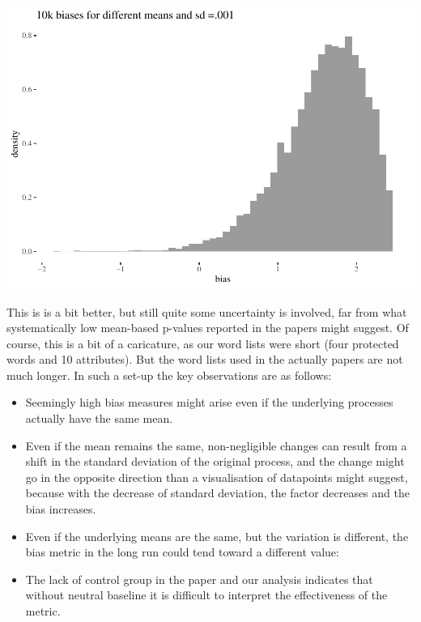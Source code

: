 \documentclass[
  10pt,
  dvipsnames,enabledeprecatedfontcommands]{scrartcl}
\begin{document}
\begin{center}\includegraphics[width=1\linewidth]{paperDraft_files/figure-latex/unnamed-chunk-16-1} \end{center}
\normalsize

This is is a bit better, but still quite some uncertainty is involved,
far from what systematically low mean-based p-values reported in the
papers might suggest. Of course, this is a bit of a caricature, as our
word lists were short (four protected words and 10 attributes). But the
word lists used in the actually papers are not much longer. In such a
set-up the key observations are as follows:

\begin{itemize}
\item
  Seemingly high bias measures might arise even if the underlying
  processes actually have the same mean.
\item
  Even if the mean remains the same, non-negligible changes can result
  from a shift in the standard deviation of the original process, and
  the change might go in the opposite direction than a visualisation of
  datapoints might suggest, because with the decrease of standard
  deviation, the factor decreases and the bias increases.
\item
  Even if the underlying means are the same, but the variation is
  different, the bias metric in the long run could tend toward a
  different value:
\item
  The lack of control group in the paper and our analysis indicates that
  without neutral baseline it is difficult to interpret the
  effectiveness of the metric.
\end{itemize}
\end{document}
